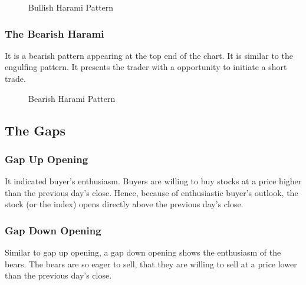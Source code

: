 \begin{figure}[h]
  \centering

  \caption{Bullish Harami Pattern}
\end{figure}

\subsubsection{The Bearish Harami}
It is a bearish pattern appearing at the top end of the chart. It is similar to the engulfing pattern. It presents the trader with a opportunity to initiate a short trade.

\begin{figure}[h]
  \centering

  \caption{Bearish Harami Pattern}
\end{figure}

\subsection{The Gaps}

\subsubsection{Gap Up Opening}
It indicated buyer's enthusiasm. Buyers are willing to buy stocks at a price higher than the previous day's close. Hence, because of enthusiastic buyer’s outlook, the stock (or the index) opens directly above the previous day’s close.

\subsubsection{Gap Down Opening}
Similar to gap up opening, a gap down opening shows the enthusiasm of the bears. The bears are so eager to sell, that they are willing to sell at a price lower than the previous day’s close.

